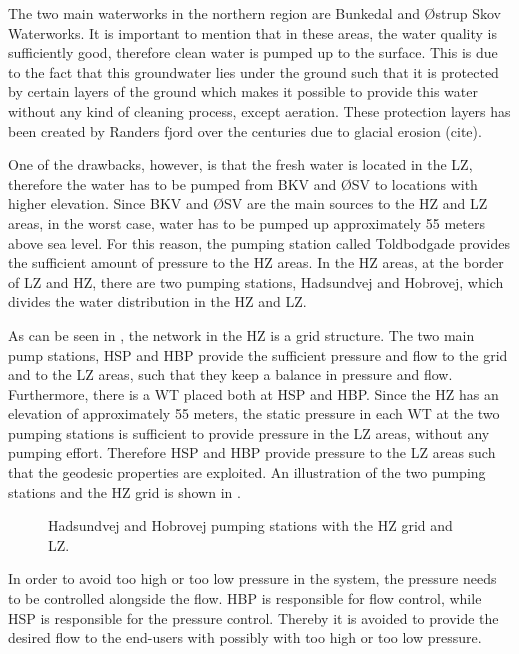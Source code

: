 The two main waterworks in the northern region are Bunkedal and Østrup Skov Waterworks. It is important to mention that in these areas, the water quality is sufficiently good, therefore clean water is pumped up to the surface. This is due to the fact that this groundwater lies under the ground such that it is protected by certain layers of the ground which makes it possible to provide this water without any kind of cleaning process, except aeration. These protection layers has been created by Randers fjord over the centuries due to glacial erosion (cite).

One of the drawbacks, however, is that the fresh water is located in the LZ, therefore the water has to be pumped from BKV and ØSV to locations with higher elevation. Since BKV and ØSV are the main sources to the HZ and LZ areas, in the worst case, water has to be pumped up approximately 55 meters above sea level. For this reason, the pumping station called Toldbodgade provides the sufficient amount of pressure to the HZ areas. In the HZ areas, at the border of LZ and HZ, there are two pumping stations, Hadsundvej and Hobrovej, which divides the water distribution in the HZ and LZ. 

As can be seen in , the network in the HZ is a grid structure. The two main pump stations, HSP and HBP provide the sufficient pressure and flow to the grid and to the LZ areas, such that they keep a balance in pressure and flow. Furthermore, there is a WT placed both at HSP and HBP. Since the HZ has an elevation of approximately 55 meters, the static pressure in each WT at the two pumping stations is sufficient to provide pressure in the LZ areas, without any pumping effort. Therefore HSP and HBP provide pressure to the LZ areas such that the geodesic properties are exploited. An illustration of the two pumping stations and the HZ grid is shown in . 

\begin{figure}[H]
\centering

\caption{Hadsundvej and Hobrovej pumping stations with the HZ grid and LZ.}
\label{fig:HBP_HSP_grid}
\end{figure}

In order to avoid too high or too low pressure in the system, the pressure needs to be controlled alongside the flow. HBP is responsible for flow control, while HSP is responsible for the pressure control. Thereby it is avoided to provide the desired flow to the end-users with possibly with too high or too low pressure. 

